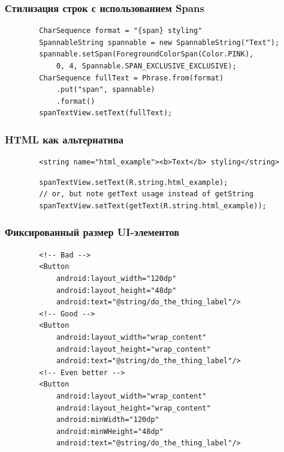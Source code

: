 \documentclass{beamer}
\begin{document}
\begin{frame}[fragile]
    \frametitle{Стилизация строк с использованием Spans}
    \begin{verbatim}
        CharSequence format = "{span} styling"
        SpannableString spannable = new SpannableString("Text");
        spannable.setSpan(ForegroundColorSpan(Color.PINK),
            0, 4, Spannable.SPAN_EXCLUSIVE_EXCLUSIVE);
        CharSequence fullText = Phrase.from(format)
            .put("span", spannable)
            .format()
        spanTextView.setText(fullText);
    \end{verbatim}
\end{frame}
\begin{frame}[fragile]
    \frametitle{HTML как альтернатива}
    \begin{verbatim}
        <string name="html_example"><b>Text</b> styling</string>
    \end{verbatim}
    \begin{verbatim}
        spanTextView.setText(R.string.html_example);
        // or, but note getText usage instead of getString
        spanTextView.setText(getText(R.string.html_example));
    \end{verbatim}
\end{frame}

\begin{frame}[fragile]
    \frametitle{Фиксированный размер UI-элементов}
    \begin{verbatim}
        <!-- Bad -->
        <Button
            android:layout_width="120dp"
            android:layout_height="48dp"
            android:text="@string/do_the_thing_label"/>
        <!-- Good -->
        <Button
            android:layout_width="wrap_content"
            android:layout_height="wrap_content"
            android:text="@string/do_the_thing_label"/>
        <!-- Even better -->
        <Button
            android:layout_width="wrap_content"
            android:layout_height="wrap_content"
            android:minWidth="120dp"
            android:minWHeight="48dp"
            android:text="@string/do_the_thing_label"/>
    \end{verbatim}
\end{frame}
\end{document}
